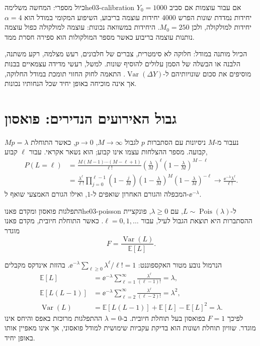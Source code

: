 \begin{example}{כיול מספרי: המחשה משלימה}{he03-calibration}
אם עבור עוצמות אם סביב $Y_0=1000$ יחידות נמדדת שונות הפרש $4000$ יחידות עוצמה בריבוע, השיפוע המקומי במודל הוא $\alpha=4$ יחידות למולקולה, ולכן $M_0=250$. היחידות במשוואה נכונות: עוצמה למולקולה כפול עוצמה נותנות עוצמה בריבוע כאשר מספר המולקולות הוא ספירה חסרת ממד.
\end{example}

\begin{remark}
הכיול מותנה במודל: חלוקה לא סימטרית, צברים של חלבונים, רעש מצלמה, רקע משתנה, הלבנה או הבשלה של הסמן עלולים להוסיף שונות. למשל, רעשי מדידה עצמאיים בבנות מוסיפים את סכום שונויותיהם ל-$\operatorname{Var}(\Delta Y)$. התאמה לחוק החזוי תומכת במודל החלוקה, אך אינה מוכיחה באופן יחיד שכל הנחותיו נכונות.
\end{remark}

\section{גבול האירועים הנדירים: פואסון}\label{sec:he03-poisson}
נעבור מ-$M$ ניסיונות עם הסתברות $p$ לגבול $M\to\infty$, $p\to0$, כאשר התוחלת $Mp=\lambda$ קבועה. מספר ההצלחות עצמו אינו קבוע; הוא נשאר אקראי. עבור $\ell$ קבוע,
\begin{align}
P(L=\ell)&=\frac{M(M-1)\cdots(M-\ell+1)}{\ell!}
\left(\frac{\lambda}{M}\right)^\ell
\left(1-\frac{\lambda}{M}\right)^{M-\ell}\label{eq:he03-poisson-limit-start}\\
&=\frac{\lambda^\ell}{\ell!}\prod_{j=0}^{\ell-1}\left(1-\frac jM\right)
\left(1-\frac{\lambda}{M}\right)^M
\left(1-\frac{\lambda}{M}\right)^{-\ell}
\longrightarrow\frac{\ee^{-\lambda}\lambda^\ell}{\ell!}.\label{eq:he03-poisson-limit}
\end{align}
המכפלה והגורם האחרון שואפים ל-$1$, ואילו הגורם האמצעי שואף ל-$\ee^{-\lambda}$.

\begin{definition}{התפלגות פואסון ומקדם פאנו}{he03-poisson}
ל-$L\sim\operatorname{Pois}(\lambda)$, עם $\lambda\ge0$, פונקציית ההסתברות היא תוצאת הגבול לעיל, עבור $\ell=0,1,\ldots$. כאשר התוחלת חיובית, מקדם פאנו מוגדר
\begin{equation}\label{eq:he03-fano-definition}
F=\frac{\operatorname{Var}(L)}{\mathbb{E}[L]}.
\end{equation}
\end{definition}
הנרמול נובע מטור האקספוננט: $\ee^{-\lambda}\sum_{\ell\ge0}\lambda^\ell/\ell!=1$. בהזזת אינדקס מקבלים
\begin{align}
\mathbb{E}[L]&=\ee^{-\lambda}\sum_{\ell=1}^\infty
\frac{\lambda^\ell}{(\ell-1)!}=\lambda,\label{eq:he03-poisson-mean}\\
\mathbb{E}[L(L-1)]&=\ee^{-\lambda}\sum_{\ell=2}^\infty
\frac{\lambda^\ell}{(\ell-2)!}=\lambda^2,\label{eq:he03-poisson-factorial}\\
\operatorname{Var}(L)&=\mathbb{E}[L(L-1)]+\mathbb{E}[L]-\mathbb{E}[L]^2=\lambda.\label{eq:he03-poisson-var}
\end{align}
לפיכך $F=1$ בפואסון בעל תוחלת חיובית. ב-$\lambda=0$ ההתפלגות מרוכזת באפס והיחס אינו מוגדר. שוויון תוחלת ושונות הוא בדיקת עקביות שימושית למודל פואסוני, אך אינו מאפיין אותו באופן יחיד.

